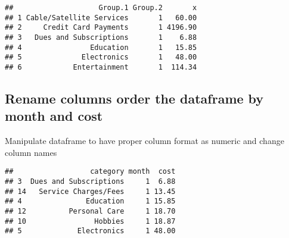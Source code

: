\documentclass[
]{article}
\newenvironment{Shaded}{\begin{snugshade}}{\end{snugshade}}
\newcommand{\DecValTok}[1]{\textcolor[rgb]{0.00,0.00,0.81}{#1}}
\newcommand{\KeywordTok}[1]{\textcolor[rgb]{0.13,0.29,0.53}{\textbf{#1}}}
\newcommand{\NormalTok}[1]{#1}
\newcommand{\OperatorTok}[1]{\textcolor[rgb]{0.81,0.36,0.00}{\textbf{#1}}}
\newcommand{\StringTok}[1]{\textcolor[rgb]{0.31,0.60,0.02}{#1}}
\begin{document}
\begin{verbatim}
##                    Group.1 Group.2       x
## 1 Cable/Satellite Services       1   60.00
## 2     Credit Card Payments       1 4196.90
## 3   Dues and Subscriptions       1    6.88
## 4                Education       1   15.85
## 5              Electronics       1   48.00
## 6            Entertainment       1  114.34
\end{verbatim}

\hypertarget{rename-columns-order-the-dataframe-by-month-and-cost}{%
\subsection{Rename columns order the dataframe by month and
cost}\label{rename-columns-order-the-dataframe-by-month-and-cost}}

Manipulate dataframe to have proper column format as numeric and change
column names

\begin{Shaded}
\end{Shaded}

\begin{verbatim}
##                  category month  cost
## 3  Dues and Subscriptions     1  6.88
## 14   Service Charges/Fees     1 13.45
## 4               Education     1 15.85
## 12          Personal Care     1 18.70
## 10                Hobbies     1 18.87
## 5             Electronics     1 48.00
\end{verbatim}
\end{document}

